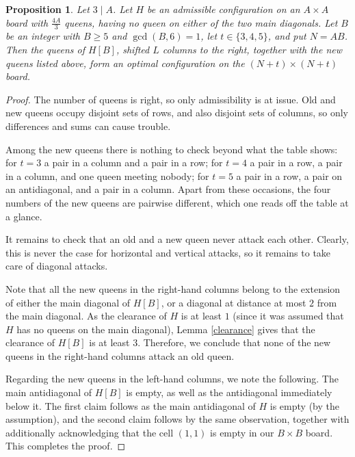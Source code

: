 \documentclass[10pt,a4paper]{amsart}
\newtheorem{proposition}{Proposition}
\begin{document}
\begin{proposition}
\label{split}
Let $3\mid A$. Let $H$ be an admissible configuration on an $A\times A$ board with $\frac{4A}3$ queens, having no queen on
either of the two main diagonals. Let $B$ be an integer with $B\geqslant5$ and
$\gcd(B,6)=1$, let $t\in\{3, 4, 5\}$, and put $N=AB$. Then the queens
of $H[B]$, shifted $L$ columns
to the right, together with the new queens listed above, form an optimal
configuration on the $(N+t)\times(N+t)$ board.
\end{proposition}

\begin{proof}
The number of queens is right, so only admissibility is at issue. Old and new
queens occupy disjoint sets of rows, and also disjoint sets of columns, so only
differences and sums can cause trouble.

Among the new queens there is nothing to check beyond what the table shows: for
$t=3$ a pair in a column and a pair in a row; for $t=4$ a pair in a row, a pair
in a column, and one queen meeting nobody; for $t=5$ a pair in a row, a pair on
an antidiagonal, and a pair in a column. Apart from these occasions, the four
numbers of the new queens are pairwise different, which one reads off the table
at a glance.

It remains to check that an old and a new queen never attack each other. Clearly, this is never the case for horizontal and vertical attacks, so it remains to take care of diagonal attacks.

Note that all the new queens in the right-hand columns belong to the extension of either the main diagonal of $H[B]$, or a diagonal at distance at most $2$ from the main diagonal. As the clearance of $H$ is at least $1$ (since it was assumed that $H$ has no queens on the main diagonal), Lemma \ref{clearance} gives that the clearance of $H[B]$ is at least $3$. Therefore, we conclude that none of the new queens in the right-hand columns attack an old queen.

Regarding the new queens in the left-hand columns, we note the following. The main antidiagonal of $H[B]$ is empty, as well as the antidiagonal immediately below it. The first claim follows as the main antidiagonal of $H$ is empty (by the assumption), and the second claim follows by the same observation, together with additionally acknowledging that the cell $(1,1)$ is empty in our $B\times B$ board. This completes the proof.
\end{proof}
\end{document}
